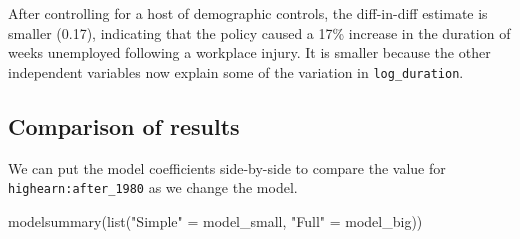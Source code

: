 \documentclass[
  letterpaper,
  DIV=11,
  numbers=noendperiod]{scrartcl}
\newenvironment{Shaded}{\begin{snugshade}}{\end{snugshade}}
\newcommand{\FunctionTok}[1]{\textcolor[rgb]{0.28,0.35,0.67}{#1}}
\newcommand{\NormalTok}[1]{\textcolor[rgb]{0.00,0.23,0.31}{#1}}
\newcommand{\OtherTok}[1]{\textcolor[rgb]{0.00,0.23,0.31}{#1}}
\newcommand{\StringTok}[1]{\textcolor[rgb]{0.13,0.47,0.30}{#1}}
\begin{document}
After controlling for a host of demographic controls, the diff-in-diff
estimate is smaller (0.17), indicating that the policy caused a 17\%
increase in the duration of weeks unemployed following a workplace
injury. It is smaller because the other independent variables now
explain some of the variation in \texttt{log\_duration}.

\hypertarget{comparison-of-results}{%
\subsection{Comparison of results}\label{comparison-of-results}}

We can put the model coefficients side-by-side to compare the value for
\texttt{highearn:after\_1980} as we change the model.

\begin{Shaded}
\begin{Highlighting}[]
\FunctionTok{modelsummary}\NormalTok{(}\FunctionTok{list}\NormalTok{(}\StringTok{"Simple"} \OtherTok{=}\NormalTok{ model\_small, }\StringTok{"Full"} \OtherTok{=}\NormalTok{ model\_big))}
\end{Highlighting}
\end{Shaded}
\end{document}

